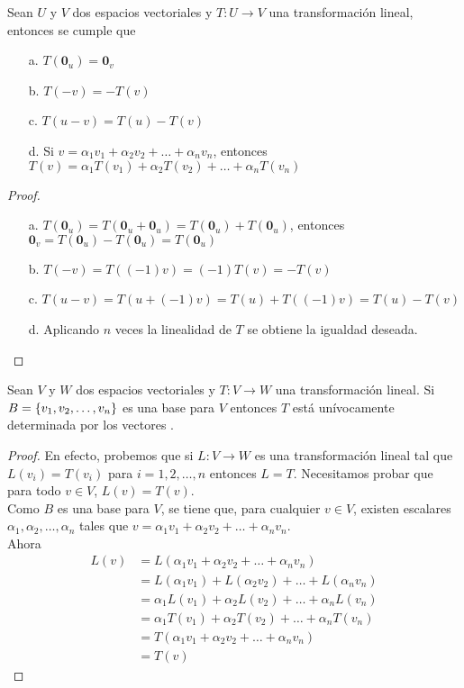 \begin{theorem}
Sean $U$ y $V$ dos espacios vectoriales y $T: U \to V$ una transformación lineal, entonces se cumple que
\begin{itemize}
\item[a. ] $T(\mathbf{0}_u) = \mathbf{0}_v$
\item[b. ] $T(-v) = -T(v)$
\item[c. ] $T(u - v) = T(u) - T(v)$
\item[d. ] Si $v = \alpha_1 v_1 + \alpha_2 v_2 + \ldots + \alpha_n v_n$, entonces $T(v) = \alpha_1 T(v_1) + \alpha_2 T(v_2) + \ldots + \alpha_n T(v_n)$
\end{itemize}
\end{theorem}

\begin{proof}
\begin{itemize}
\item[a. ] $T(\mathbf{0}_u) = T(\mathbf{0}_u + \mathbf{0}_u) = T(\mathbf{0}_u) + T(\mathbf{0}_u)$, entonces $\mathbf{0}_v = T(\mathbf{0}_u)- T(\mathbf{0}_u) = T(\mathbf{0}_u)$
\item[b. ] $T(-v) = T((-1)v) = (-1) T(v) = -T(v)$
\item [c. ] $T(u-v) = T(u+(-1)v) = T(u) + T((-1)v) = T(u) - T(v)$
\item [d. ] Aplicando $n$ veces la linealidad de $T$ se obtiene la igualdad deseada.
\end{itemize}
\end{proof}

\begin{theorem}
\label{th:ag}
Sean $V$ y $W$ dos espacios vectoriales y $T: V \to W$ una transformación lineal. Si $B =  \lbrace v_1, v_2, \ldots, v_n \rbrace$ es una base para $V$ entonces $T$ está unívocamente determinada por los vectores .
\end{theorem}

\begin{proof}
En efecto, probemos que si $L: V \to W$ es una transformación lineal tal que $L(v_i) = T(v_i)$ para $i = 1, 2, \ldots , n$ entonces $L = T$. Necesitamos probar que para todo $v \in V$, $L(v) = T(v)$.
\\

Como $B$ es una base para $V$, se tiene que, para cualquier $v \in V$, existen escalares $\alpha_1, \alpha_2, \ldots , \alpha_n$ tales que $v = \alpha_1 v_1 + \alpha_2 v_2 + \ldots + \alpha_n v_n$.\\

Ahora
\begin{align*}
L(v) &= L(\alpha_1 v_1 + \alpha_2 v_2 + \ldots + \alpha_n v_n)\\
&= L(\alpha_1 v_1) + L(\alpha_2 v_2) + \ldots + L(\alpha_n v_n)\\
&=\alpha_1 L(v_1) + \alpha_2 L(v_2) + \ldots + \alpha_n L(v_n)\\ 
&=\alpha_1 T(v_1) + \alpha_2 T(v_2) + \ldots + \alpha_n T(v_n)\\
&= T(\alpha_1 v_1 + \alpha_2 v_2 + \ldots + \alpha_n v_n)\\
&= T(v) 
\end{align*}
\end{proof}



